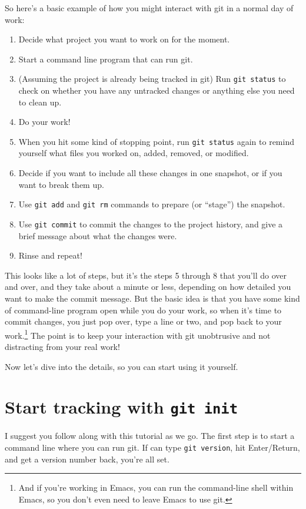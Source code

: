 \documentclass[11pt]{article}
\begin{document}
So here's a basic example of how you might interact with git in a normal day of work:
\begin{enumerate}
\item Decide what project you want to work on for the moment.
\item Start a command line program that can run git.
\item (Assuming the project is already being tracked in git) Run \texttt{git status} to check on whether you have any untracked changes or anything else you need to clean up.
\item Do your work!
\item When you hit some kind of stopping point, run \texttt{git status} again to remind yourself what files you worked on, added, removed, or modified.
\item Decide if you want to include all these changes in one snapshot, or if you want to break them up.
\item Use \texttt{git add} and \texttt{git rm} commands to prepare (or ``stage'') the snapshot.
\item Use \texttt{git commit} to commit the changes to the project history, and give a brief message about what the changes were.
\item Rinse and repeat!
\end{enumerate}

This looks like a lot of steps, but it's the steps 5 through 8 that you'll do over and over, and they take about a minute or less, depending on how detailed you want to make the commit message.  But the basic idea is that you have some kind of command-line program open while you do your work, so when it's time to commit changes, you just pop over, type a line or two, and pop back to your work.\footnote{And if you're working in Emacs, you can run the command-line shell within Emacs, so you don't even need to leave Emacs to use git.
 } The point is to keep your interaction with git unobtrusive and not distracting from your real work!

Now let's dive into the details, so you can start using it yourself.
\section{Start tracking with \texttt{git init}}
\label{sec-5}

I suggest you follow along with this tutorial as we go. The first step is to start a command line where you can run git.  If can type \texttt{git version}, hit Enter/Return, and get a version number back, you're all set.
\end{document}
